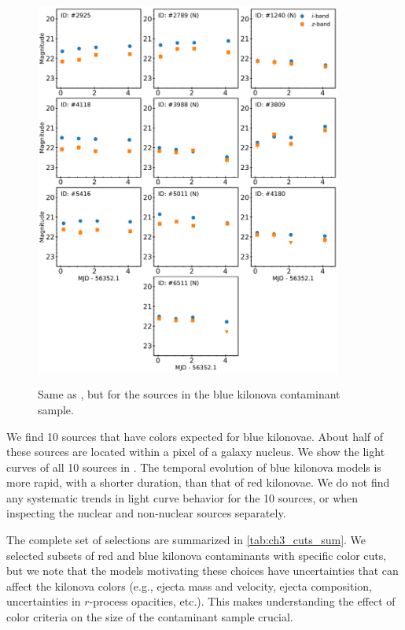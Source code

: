 \begin{figure}[!t]
\begin{center}
\hspace*{-0.1in}
\scalebox{1.}
{\includegraphics[width=0.9\textwidth]{./figs/chapter3/f5.pdf}}
\caption{\singlespace Same as , but for the sources in the blue kilonova contaminant sample.}
\label{fig:ch3_final_lc_blue}
\end{center}
\vspace{1.1cm}
\end{figure}

\clearpage
We find 10 sources that have colors expected for blue kilonovae. About half of these sources are located within a pixel of a galaxy nucleus. We show the light curves of all 10 sources in . The temporal evolution of blue kilonova models is more rapid, with a shorter duration, than that of red kilonovae. We do not find any systematic trends in light curve behavior for the 10 sources, or when inspecting the nuclear and non-nuclear sources separately.

The complete set of selections are summarized in \cref{tab:ch3_cuts_sum}. We selected subsets of red and blue kilonova contaminants with specific color cuts, but we note that the models motivating these choices have uncertainties that can affect the kilonova colors (e.g., ejecta mass and velocity, ejecta composition, uncertainties in $r$-process opacities, etc.). This makes understanding the effect of color criteria on the size of the contaminant sample crucial.


